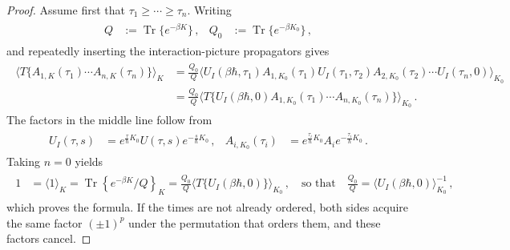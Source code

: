 \documentclass[../QFT_main.tex]{subfiles}
\begin{document}
\begin{proof}
Assume first that $\tau_1\geq\cdots\geq\tau_n$.
Writing
{\small\begin{align}\begin{aligned}
    Q&:=\operatorname{Tr}\big\{e^{-\beta K}\big\}\,,
    &
    Q_0&:=\operatorname{Tr}\big\{e^{-\beta K_0}\big\}\,,
\end{aligned}\end{align}}
and repeatedly inserting the interaction-picture propagators gives
{\small\begin{align}\begin{aligned}
    \Big\langle
        T\big\{
            A_{1,K}(\tau_1)\cdots A_{n,K}(\tau_n)
        \big\}
    \Big\rangle_K
    &=
    \tfrac{Q_0}{Q}
    \Big\langle
        U_I(\beta\hbar,\tau_1)
        A_{1,K_0}(\tau_1)
        U_I(\tau_1,\tau_2)
        A_{2,K_0}(\tau_2)
        \cdots
        U_I(\tau_n,0)
    \Big\rangle_{K_0}
    \\
    &=
    \tfrac{Q_0}{Q}
    \Big\langle
        T\big\{
            U_I(\beta\hbar,0)
            A_{1,K_0}(\tau_1)\cdots A_{n,K_0}(\tau_n)
        \big\}
    \Big\rangle_{K_0}\,.
\end{aligned}\end{align}}
The factors in the middle line follow from
{\small\begin{align}\begin{aligned}
    U_I(\tau,s)
    &=
    e^{\tfrac{\tau}{\hbar}K_0}
    U(\tau,s)
    e^{-\tfrac{s}{\hbar}K_0}\,,
    &
    A_{i,K_0}(\tau_i)
    &=
    e^{\tfrac{\tau_i}{\hbar}K_0}
    A_i
    e^{-\tfrac{\tau_i}{\hbar}K_0}\,.
\end{aligned}\end{align}}
Taking $n=0$ yields
{\small\begin{align}\begin{aligned}
    1
    &=
    \langle 1 \rangle_K
    =\operatorname{Tr}\left\{e^{-\beta K}/Q\right\}_K
    =
    \tfrac{Q_0}{Q}
    \big\langle T\big\{ U_I(\beta\hbar,0)\big\}\big\rangle_{K_0}\,,
    \quad\text{so that}\quad
    \tfrac{Q_0}{Q}
    =
    \big\langle U_I(\beta\hbar,0)\big\rangle_{K_0}^{-1}\,,
\end{aligned}\end{align}}
which proves the formula.
If the times are not already ordered, both sides acquire the same factor $(\pm1)^p$ under the permutation that orders them, and these factors cancel.
\end{proof}
\end{document}
